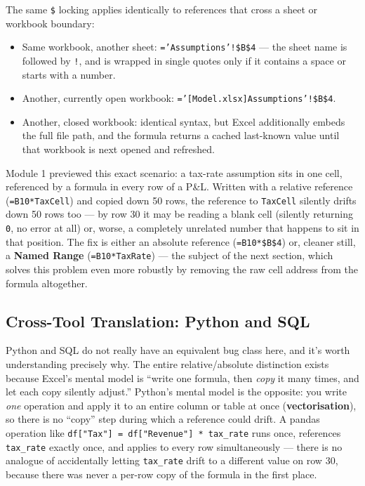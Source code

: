 \documentclass[11pt,a4paper]{article}
\begin{document}
The same \texttt{\$} locking applies identically to references that cross a sheet or workbook boundary:

\begin{formulasyntax}
\begin{itemize}
  \item Same workbook, another sheet: \texttt{='Assumptions'!\$B\$4} --- the sheet name is followed by \texttt{!}, and is wrapped in single quotes only if it contains a space or starts with a number.
  \item Another, currently open workbook: \texttt{='[Model.xlsx]Assumptions'!\$B\$4}.
  \item Another, closed workbook: identical syntax, but Excel additionally embeds the full file path, and the formula returns a cached last-known value until that workbook is next opened and refreshed.
\end{itemize}
\end{formulasyntax}

\begin{pitfall}
Module 1 previewed this exact scenario: a tax-rate assumption sits in one cell, referenced by a formula in every row of a P\&L. Written with a relative reference (\texttt{=B10*TaxCell}) and copied down 50 rows, the reference to \texttt{TaxCell} silently drifts down 50 rows too --- by row 30 it may be reading a blank cell (silently returning \texttt{0}, no error at all) or, worse, a completely unrelated number that happens to sit in that position. The fix is either an absolute reference (\texttt{=B10*\$B\$4}) or, cleaner still, a \textbf{Named Range} (\texttt{=B10*TaxRate}) --- the subject of the next section, which solves this problem even more robustly by removing the raw cell address from the formula altogether.
\end{pitfall}

\subsection{Cross-Tool Translation: Python and SQL}

\begin{keyconcept}
Python and SQL do not really have an equivalent bug class here, and it's worth understanding precisely why. The entire relative/absolute distinction exists because Excel's mental model is ``write one formula, then \emph{copy} it many times, and let each copy silently adjust.'' Python's mental model is the opposite: you write \emph{one} operation and apply it to an entire column or table at once (\textbf{vectorisation}), so there is no ``copy'' step during which a reference could drift. A pandas operation like \texttt{df["Tax"] = df["Revenue"] * tax\_rate} runs once, references \texttt{tax\_rate} exactly once, and applies to every row simultaneously --- there is no analogue of accidentally letting \texttt{tax\_rate} drift to a different value on row 30, because there was never a per-row copy of the formula in the first place.
\end{keyconcept}
\end{document}
